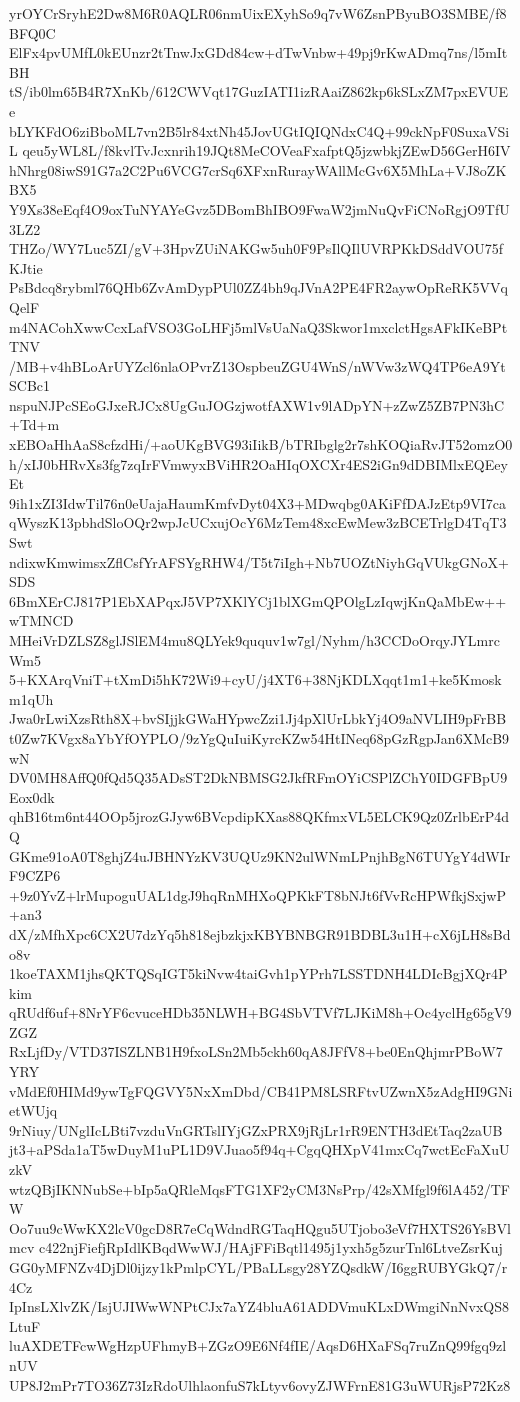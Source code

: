 yrOYCrSryhE2Dw8M6R0AQLR06nmUixEXyhSo9q7vW6ZsnPByuBO3SMBE/f8BFQ0C
ElFx4pvUMfL0kEUnzr2tTnwJxGDd84cw+dTwVnbw+49pj9rKwADmq7ns/l5mItBH
tS/ib0lm65B4R7XnKb/612CWVqt17GuzIATI1izRAaiZ862kp6kSLxZM7pxEVUEe
bLYKFdO6ziBboML7vn2B5lr84xtNh45JovUGtIQIQNdxC4Q+99ckNpF0SuxaVSiL
qeu5yWL8L/f8kvlTvJcxnrih19JQt8MeCOVeaFxafptQ5jzwbkjZEwD56GerH6IV
hNhrg08iwS91G7a2C2Pu6VCG7crSq6XFxnRurayWAllMcGv6X5MhLa+VJ8oZKBX5
Y9Xs38eEqf4O9oxTuNYAYeGvz5DBomBhIBO9FwaW2jmNuQvFiCNoRgjO9TfU3LZ2
THZo/WY7Luc5ZI/gV+3HpvZUiNAKGw5uh0F9PsIlQIlUVRPKkDSddVOU75fKJtie
PsBdcq8rybml76QHb6ZvAmDypPUl0ZZ4bh9qJVnA2PE4FR2aywOpReRK5VVqQelF
m4NACohXwwCcxLafVSO3GoLHFj5mlVsUaNaQ3Skwor1mxclctHgsAFkIKeBPtTNV
/MB+v4hBLoArUYZcl6nlaOPvrZ13OspbeuZGU4WnS/nWVw3zWQ4TP6eA9YtSCBc1
nspuNJPcSEoGJxeRJCx8UgGuJOGzjwotfAXW1v9lADpYN+zZwZ5ZB7PN3hC+Td+m
xEBOaHhAaS8cfzdHi/+aoUKgBVG93iIikB/bTRIbglg2r7shKOQiaRvJT52omzO0
h/xIJ0bHRvXs3fg7zqIrFVmwyxBViHR2OaHIqOXCXr4ES2iGn9dDBIMlxEQEeyEt
9ih1xZI3IdwTil76n0eUajaHaumKmfvDyt04X3+MDwqbg0AKiFfDAJzEtp9VI7ca
qWyszK13pbhdSloOQr2wpJcUCxujOcY6MzTem48xcEwMew3zBCETrlgD4TqT3Swt
ndixwKmwimsxZflCsfYrAFSYgRHW4/T5t7iIgh+Nb7UOZtNiyhGqVUkgGNoX+SDS
6BmXErCJ817P1EbXAPqxJ5VP7XKlYCj1blXGmQPOlgLzIqwjKnQaMbEw++wTMNCD
MHeiVrDZLSZ8glJSlEM4mu8QLYek9ququv1w7gl/Nyhm/h3CCDoOrqyJYLmrcWm5
5+KXArqVniT+tXmDi5hK72Wi9+cyU/j4XT6+38NjKDLXqqt1m1+ke5Kmoskm1qUh
Jwa0rLwiXzsRth8X+bvSIjjkGWaHYpwcZzi1Jj4pXlUrLbkYj4O9aNVLIH9pFrBB
t0Zw7KVgx8aYbYfOYPLO/9zYgQuIuiKyrcKZw54HtINeq68pGzRgpJan6XMcB9wN
DV0MH8AffQ0fQd5Q35ADsST2DkNBMSG2JkfRFmOYiCSPlZChY0IDGFBpU9Eox0dk
qhB16tm6nt44OOp5jrozGJyw6BVcpdipKXas88QKfmxVL5ELCK9Qz0ZrlbErP4dQ
GKme91oA0T8ghjZ4uJBHNYzKV3UQUz9KN2ulWNmLPnjhBgN6TUYgY4dWIrF9CZP6
+9z0YvZ+lrMupoguUAL1dgJ9hqRnMHXoQPKkFT8bNJt6fVvRcHPWfkjSxjwP+an3
dX/zMfhXpc6CX2U7dzYq5h818ejbzkjxKBYBNBGR91BDBL3u1H+cX6jLH8sBdo8v
1koeTAXM1jhsQKTQSqIGT5kiNvw4taiGvh1pYPrh7LSSTDNH4LDIcBgjXQr4Pkim
qRUdf6uf+8NrYF6cvuceHDb35NLWH+BG4SbVTVf7LJKiM8h+Oc4yclHg65gV9ZGZ
RxLjfDy/VTD37ISZLNB1H9fxoLSn2Mb5ckh60qA8JFfV8+be0EnQhjmrPBoW7YRY
vMdEf0HIMd9ywTgFQGVY5NxXmDbd/CB41PM8LSRFtvUZwnX5zAdgHI9GNietWUjq
9rNiuy/UNglIcLBti7vzduVnGRTslIYjGZxPRX9jRjLr1rR9ENTH3dEtTaq2zaUB
jt3+aPSda1aT5wDuyM1uPL1D9VJuao5f94q+CgqQHXpV41mxCq7wctEcFaXuUzkV
wtzQBjIKNNubSe+bIp5aQRleMqsFTG1XF2yCM3NsPrp/42sXMfgl9f6lA452/TFW
Oo7uu9cWwKX2lcV0gcD8R7eCqWdndRGTaqHQgu5UTjobo3eVf7HXTS26YsBVlmcv
c422njFiefjRpIdlKBqdWwWJ/HAjFFiBqtl1495j1yxh5g5zurTnl6LtveZsrKuj
GG0yMFNZv4DjDl0ijzy1kPmlpCYL/PBaLLsgy28YZQsdkW/I6ggRUBYGkQ7/r4Cz
IpInsLXlvZK/IsjUJIWwWNPtCJx7aYZ4bluA61ADDVmuKLxDWmgiNnNvxQS8LtuF
luAXDETFcwWgHzpUFhmyB+ZGzO9E6Nf4fIE/AqsD6HXaFSq7ruZnQ99fgq9zlnUV
UP8J2mPr7TO36Z73IzRdoUlhlaonfuS7kLtyv6ovyZJWFrnE81G3uWURjsP72Kz8
